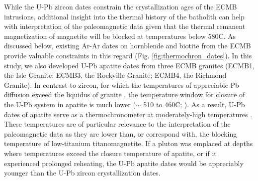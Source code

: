 \documentclass[draft]{agujournal2019}
\begin{document}
While the U-Pb zircon dates constrain the crystallization ages of the ECMB intrusions, additional insight into the thermal history of the batholith can help with interpretation of the paleomagnetic data given that the thermal remanent magnetization of magnetite will be blocked at temperatures below 580\textdegree C. As discussed below, existing Ar-Ar dates on hornblende and biotite from the ECMB provide valuable constraints in this regard (Fig. \ref{fig:thermochron_dates}). In this study, we also developed U-Pb apatite dates from three ECMB granites (ECMB1, the Isle Granite; ECMB3, the Rockville Granite; ECMB4, the Richmond Granite). In contrast to zircon, for which the temperatures of appreciable Pb diffusion exceed the liquidus of granite \cite{Cherniak2001a}, the temperature window for closure of the U-Pb system in apatite is much lower ($\sim$ 510 to 460\textdegree C; ). As a result, U-Pb dates of apatite serve as a thermochronometer at moderately-high temperatures \cite{Chamberlain2001a, Schoene2007a, Cochrane2014a}. These temperatures are of particular relevance to the interpretation of the paleomagnetic data as they are lower than, or correspond with, the blocking temperature of low-titanium titanomagnetite. If a pluton was emplaced at depths where temperatures exceed the closure temperature of apatite, or if it experienced prolonged reheating, the U-Pb apatite dates would be appreciably younger than the U-Pb zircon crystallization dates.
\end{document}
